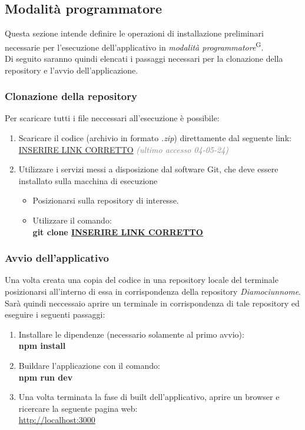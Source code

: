     \subsection{Modalità programmatore}\label{sec:install_run:esperto}
    Questa sezione intende definire le operazioni di installazione preliminari necessarie per l'esecuzione dell'applicativo in \textit{modalità programmatore}\textsuperscript{G}.\\
    Di seguito saranno quindi elencati i passaggi necessari per la clonazione della repository e l'avvio dell'applicazione. \\
    
    \subsubsection{Clonazione della repository}\label{sec:install_run:esperto:clone}
    Per scaricare tutti i file neccessari all'esecuzione è possibile: 
    \begin{enumerate}
        \item Scaricare il codice (archivio in formato \textit{.zip}) direttamente dal seguente link: \\  
        \url{INSERIRE LINK CORRETTO} \textcolor{gray}{\textit{(ultimo accesso 04-05-24)}}
        \item Utilizzare i servizi messi a disposizione dal software Git, che deve essere installato sulla macchina di esecuzione
        \begin{itemize}
            \item Posizionarsi sulla repository di interesse.
            \item Utilizzare il comando:\\
            \textbf{git clone \url{INSERIRE LINK CORRETTO} }
        \end{itemize}
    \end{enumerate}

    \subsubsection{Avvio dell'applicativo}\label{sec:install_run:esperto:avvio}
    Una volta creata una copia del codice in una repository locale del terminale posizionarsi all'interno di essa in corrispondenza della repository \textit{Diamociunnome}.\\
    Sarà quindi neccessaio aprire un terminale in corrispondenza di tale repository ed eseguire i seguenti passaggi: 
    \begin{enumerate}
        \item Installare le dipendenze (necessario solamente al primo avvio): \\  
        \textbf{npm install}
        \item Buildare l'applicazione con il comando: \\  
        \textbf{npm run dev}
        \item Una volta terminata la fase di built dell'applicativo, aprire un browser e ricercare la seguente pagina web: \\  
        \url{http://localhost:3000}
    \end{enumerate}

